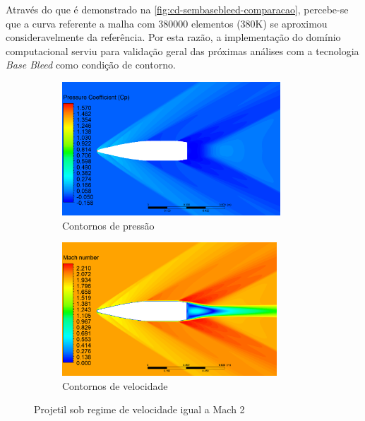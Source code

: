 Através do que é demonstrado na \autoref{fig:cd-sembasebleed-comparacao}, percebe-se que a curva referente a malha com \num{380000} elementos (380K) se aproximou consideravelmente da referência. Por esta razão, a implementação do domínio computacional serviu para validação geral das próximas análises com a tecnologia \textit{Base Bleed} como condição de contorno.

\begin{figure}[!htpb]
	\centering
	\begin{subfigure}[b]{0.47\textwidth}
        \centering
        \includegraphics[height=5cm,width=\textwidth]{contorno-pressao.png}
        \caption{Contornos de pressão}
        \label{fig:contorno-pressao-sembasebleed}
    \end{subfigure}
    \hfill
	\begin{subfigure}[b]{0.47\textwidth}
        \centering
        \includegraphics[height=5cm,width=\textwidth]{contorno-velocidade.png}
        \caption{Contornos de velocidade}
        \label{fig:contorno-velocidade-sembasebleed}
    \end{subfigure}
	\caption{Projetil sob regime de velocidade igual a Mach \num{2}}
	\label{fig:contornos-pressao-velocidade-sembasebleed}
\end{figure}

